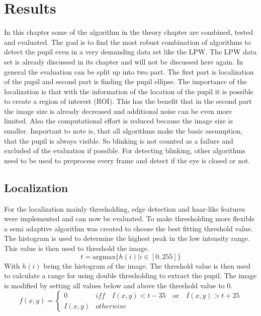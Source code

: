 \section{Results}
In this chapter some of the algorithm in the theory chapter are combined, tested and evaluated. The goal is to find the most robust combination of algorithms to detect the pupil even in a very demanding data set like the LPW. The LPW data set is already discussed in its chapter and will not be discussed here again. In general the evaluation can be split up into two part. The first part is localization of the pupil and second part is finding the pupil ellipse. The importance of the localization is that with the information of the location of the pupil it is possible to create a region of interest (ROI). This has the benefit that in the second part the image size is already decreased and additional noise can be even more limited. Also the computational effort is reduced because the image size is smaller. Important to note is, that all algorithms make the basic assumption, that the pupil is always visible. So blinking is not counted as a failure and excluded of the evaluation if possible. For detecting blinking, other algorithms need to be used to preprocess every frame and detect if the eye is closed or not. 


\subsection{Localization}
For the localization mainly thresholding, edge detection and haar-like features were implemented and can now be evaluated. To make thresholding more flexible a semi adaptive algorithm was created to choose the best fitting threshold value. The histogram is used to determine the highest peak in the low intensity range. This value is then used to threshold the image. 
\begin{equation}
    t = \text{argmax} \{h(i) | i \in [0,255]\}
\end{equation}
With $h(i)$ being the histogram of the image. The threshold value is then used to calculate a range for using double thresholding to extract the pupil. The image is modified by setting all values below and above the threshold value to 0. 
\begin{equation}
    f(x,y)= \begin{cases}
        0 &iff \quad I(x,y) < t-35 \quad \text{or} \quad I(x,y) > t+25 \\
        I(x,y) &otherwise
    \end{cases}
\end{equation}
